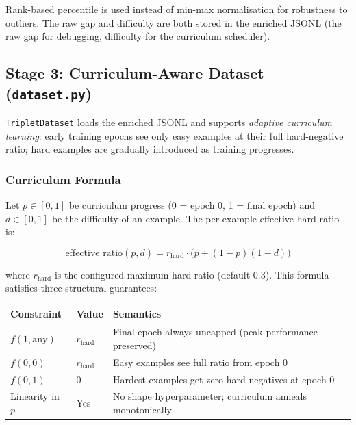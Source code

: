\documentclass[11pt,a4paper]{article}
\newcommand{\coderef}[1]{\texttt{\small\color{layer2}#1}}
\begin{document}
Rank-based percentile is used instead of min-max normalisation for robustness
to outliers. The raw gap and difficulty are both stored in the enriched JSONL
(the raw gap for debugging, difficulty for the curriculum scheduler).

\subsection{Stage 3: Curriculum-Aware Dataset (\texttt{dataset.py})}
\label{sec:dataset}

\coderef{TripletDataset} loads the enriched JSONL and supports \emph{adaptive
curriculum learning}: early training epochs see only easy examples at their
full hard-negative ratio; hard examples are gradually introduced as training
progresses.

\subsubsection{Curriculum Formula}

Let $p \in [0, 1]$ be curriculum progress (0 = epoch 0, 1 = final epoch) and
$d \in [0, 1]$ be the difficulty of an example. The per-example effective hard
ratio is:

\begin{equation}
  \label{eq:curriculum}
  \text{effective\_ratio}(p, d) = r_{\text{hard}} \cdot \bigl(p + (1-p)(1-d)\bigr)
\end{equation}

where $r_{\text{hard}}$ is the configured maximum hard ratio (default 0.3).
This formula satisfies three structural guarantees:

\begin{center}
\begin{tabular}{@{}lll@{}}
\toprule
\textbf{Constraint} & \textbf{Value} & \textbf{Semantics} \\
\midrule
$f(1, \text{any})$  & $r_{\text{hard}}$     & Final epoch always uncapped (peak performance preserved) \\
$f(0, 0)$           & $r_{\text{hard}}$     & Easy examples see full ratio from epoch 0 \\
$f(0, 1)$           & $0$                   & Hardest examples get zero hard negatives at epoch 0 \\
Linearity in $p$    & Yes                   & No shape hyperparameter; curriculum anneals monotonically \\
\bottomrule
\end{tabular}
\end{center}
\end{document}
